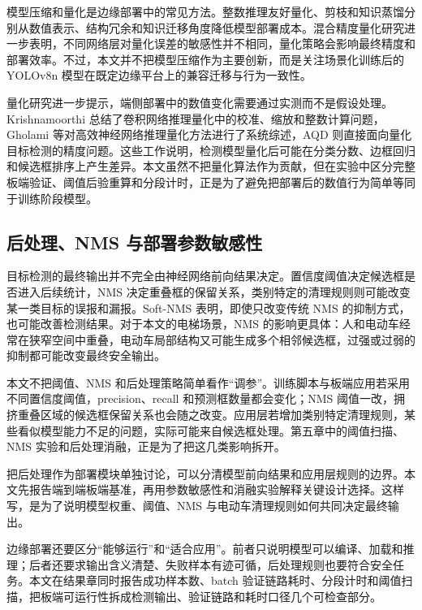 模型压缩和量化是边缘部署中的常见方法。整数推理友好量化、剪枝和知识蒸馏分别从数值表示、结构冗余和知识迁移角度降低模型部署成本\cite{jacob2018quantization,han2016deep,hinton2015distilling}。混合精度量化研究进一步表明，不同网络层对量化误差的敏感性并不相同，量化策略会影响最终精度和部署效率\cite{dong2019hawq}。不过，本文并不把模型压缩作为主要创新，而是关注场景化训练后的 YOLOv8n 模型在既定边缘平台上的兼容迁移与行为一致性。

量化研究进一步提示，端侧部署中的数值变化需要通过实测而不是假设处理。Krishnamoorthi 总结了卷积网络推理量化中的校准、缩放和整数计算问题\cite{krishnamoorthi2018quantizing}，Gholami 等对高效神经网络推理量化方法进行了系统综述\cite{gholami2021quantization}，AQD 则直接面向量化目标检测的精度问题\cite{chen2021aqd}。这些工作说明，检测模型量化后可能在分类分数、边框回归和候选框排序上产生差异。本文虽然不把量化算法作为贡献，但在实验中区分完整板端验证、阈值后验重算和分段计时，正是为了避免把部署后的数值行为简单等同于训练阶段模型。

\subsection{后处理、NMS 与部署参数敏感性}

目标检测的最终输出并不完全由神经网络前向结果决定。置信度阈值决定候选框是否进入后续统计，NMS 决定重叠框的保留关系，类别特定的清理规则则可能改变某一类目标的误报和漏报。Soft-NMS 表明，即使只改变传统 NMS 的抑制方式，也可能改善检测结果\cite{bodla2017softnms}。对于本文的电梯场景，NMS 的影响更具体：人和电动车经常在狭窄空间中重叠，电动车局部结构又可能生成多个相邻候选框，过强或过弱的抑制都可能改变最终安全输出。

本文不把阈值、NMS 和后处理策略简单看作“调参”。训练脚本与板端应用若采用不同置信度阈值，precision、recall 和预测框数量都会变化；NMS 阈值一改，拥挤重叠区域的候选框保留关系也会随之改变。应用层若增加类别特定清理规则，某些看似模型能力不足的问题，实际可能来自候选框处理。第五章中的阈值扫描、NMS 实验和后处理消融，正是为了把这几类影响拆开。

把后处理作为部署模块单独讨论，可以分清模型前向结果和应用层规则的边界。本文先报告端到端板端基准，再用参数敏感性和消融实验解释关键设计选择。这样写，是为了说明模型权重、阈值、NMS 与电动车清理规则如何共同决定最终输出。

边缘部署还要区分“能够运行”和“适合应用”。前者只说明模型可以编译、加载和推理；后者还要求输出含义清楚、失败样本有迹可循，后处理规则也要符合安全任务。本文在结果章同时报告成功样本数、batch 验证链路耗时、分段计时和阈值扫描，把板端可运行性拆成检测输出、验证链路和耗时口径几个可检查部分。

